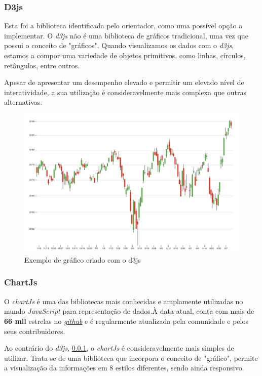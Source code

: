 \subsubsection{\textbf{D3js}}\label{sec:d3js}
Esta foi a biblioteca identificada pelo orientador, como uma possível opção a implementar. O \textit{d3js} não é uma biblioteca de gráficos tradicional, uma vez que possui o conceito de "gráficos". Quando visualizamos os dados com o \textit{d3js}, estamos a compor uma variedade de objetos primitivos, como linhas, círculos, retângulos, entre outros. 

Apesar de apresentar um desempenho elevado e permitir um elevado nível de interatividade, a sua utilização é consideravelmente mais complexa que outras alternativas.


\begin{figure}[h!]
    \centering
    \includegraphics[width=\textwidth]{figs/d3js.png}
    \caption[Gráfico d3js]{Exemplo de gráfico criado com o d3js}
    \label{fig:d3js}
\end{figure}

\subsubsection{\textbf{ChartJs}}\label{sec:chartjs}
O \textit{chartJs} é uma das bibliotecas mais conhecidas e amplamente utilizadas no mundo \textit{JavaScript} para representação de dados.À data atual, conta com mais de \textbf{66 mil} estrelas no \href{https://github.com/chartjs/Chart.js}{\textit{github}} e é regularmente atualizada pela comunidade e pelos seus contribuidores.

Ao contrário do \textit{d3js}, \ref{sec:d3js}, o \textit{chartJs} é consideravelmente mais simples de utilizar. Trata-se de uma biblioteca que incorpora o conceito  de "gráfico", permite a visualização da informações em 8 estilos diferentes, sendo ainda responsivo. 

